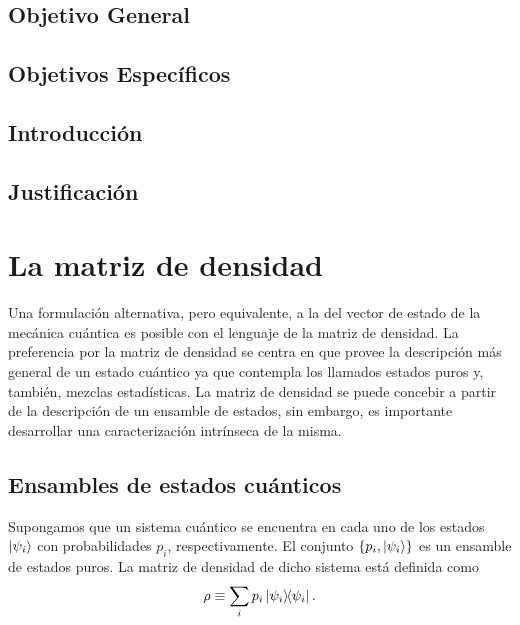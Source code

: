 \documentclass[11pt,dvipsnames]{report}
\begin{document}
\newtheorem{property}{Propiedad}[section]

\section*{Objetivo General}



\section*{Objetivos Específicos}


\section*{Introducción}


\section*{Justificación}


\chapter{La matriz de densidad}
Una formulación alternativa, pero equivalente, a la del vector de estado 
de la mecánica cuántica es posible con el lenguaje de la matriz de densidad. 
La preferencia por la matriz de densidad se centra en que provee la descripción
más general de un estado cuántico ya que contempla los llamados estados puros y,
también, mezclas estadísticas. La matriz de densidad se puede concebir 
a partir de la descripción de un ensamble de estados, sin embargo, es importante
desarrollar una caracterización intrínseca de la misma. 

\section{Ensambles de estados cuánticos}
Supongamos que un sistema cuántico se encuentra en cada uno de los estados 
$\ket{\psi _i}$ con probabilidades $p_i$, respectivamente. El conjunto 
$\{p_i,\ket{\psi _i} \}$ es un ensamble de estados puros. La matriz de 
densidad de dicho sistema está definida como
\begin{equation}
	\rho \equiv \sum _i p_i\dyad{\psi_i}{\psi_i}.
	\label{eq:rho_def}
\end{equation}
\end{document}
